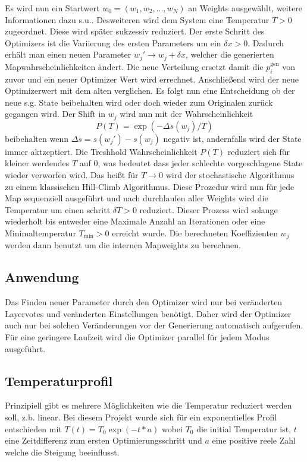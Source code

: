 Es wird nun ein Startwert $w_0=(w_1,w_2,...,w_N)$ an Weights ausgewählt, weitere Informationen dazu s.u.. 
Desweiteren wird dem System eine \glqq Temperatur \grqq $T>0$ zugeordnet. 
Diese wird später sukzessiv reduziert.
Der erste Schritt des Optimizers ist die Variierung des ersten Parameters um ein $\delta x>0$.
Dadurch erhält man einen neuen Parameter $w_j' \rightarrow w_j + \delta x$, welcher die generierten Mapwahrscheinlichkeiten ändert.
Die neue Verteilung ersetzt damit die $p_i^\text{gen}$ von zuvor und ein neuer Optimizer Wert wird errechnet.
Anschließend wird der neue Optimizerwert mit dem alten verglichen.
Es folgt nun eine Entscheidung ob der neue s.g. State beibehalten wird oder doch wieder zum Originalen zurück gegangen wird.
Der Shift in $w_j$ wird nun mit der Wahrscheinlichkeit 
\begin{equation}
    P(T) = \exp\left(-\Delta s(w_j)/T\right) 
\end{equation}
beibehalten wenn $\Delta s = s(w_j')-s(w_j)$ negativ ist, andernfalls wird der State immer aktzeptiert. 
Die Treshhold Wahrscheinlichkeit $P(T)$ reduziert sich für kleiner werdendes $T$ auf 0, was bedeutet dass jeder \glqq schlechte \grqq vorgeschlagene State wieder verworfen wird. 
Das heißt für $T\rightarrow 0$ wird der stochastische Algorithmus zu einem klassischen Hill-Climb Algorithmus.
Diese Prozedur wird nun für jede Map sequenziell ausgeführt und nach durchlaufen aller Weights wird die Temperatur um einen schritt $\delta T>0$ reduziert. 
Dieser Prozess wird solange wiederholt bis entweder eine Maximale Anzahl an Iterationen oder eine Minimaltemperatur $T_\text{min}>0$ erreicht wurde.
Die berechneten Koeffizienten $w_j$ werden dann benutzt um die internen Mapweights zu berechnen.
\subsection{Anwendung}
Das Finden neuer Parameter durch den Optimizer wird nur bei veränderten Layervotes und veränderten Einstellungen benötigt.
Daher wird der Optimizer auch nur bei solchen Veränderungen vor der Generierung automatisch aufgerufen.
Für eine geringere Laufzeit wird die Optimizer parallel für jedem Modus ausgeführt.
\subsection{Temperaturprofil}
Prinzipiell gibt es mehrere Möglichkeiten wie die Temperatur reduziert werden soll, z.b. linear. 
Bei diesem Projekt wurde sich für ein exponentielles Profil entschieden mit $T(t) = T_0 \exp\left(-t*a\right)$ wobei $T_0$ die initial Temperatur ist, $t$ eine Zeitdifferenz zum ersten Optimierungsschritt und $a$ eine positive reele Zahl welche die Steigung beeinflusst. 
